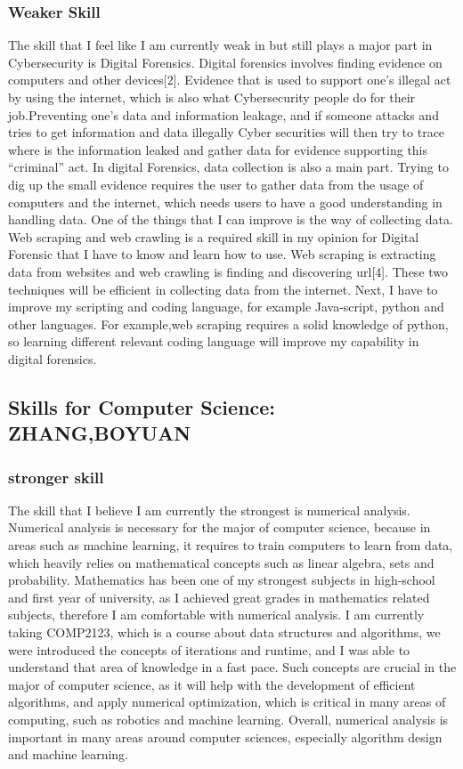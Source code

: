 \documentclass[a4paper, 11pt]{report}
\begin{document}
\subsubsection{Weaker Skill}
	The skill that I feel like I am currently weak in but still plays a major part in Cybersecurity is Digital Forensics. Digital forensics involves finding evidence on computers and other devices[2]. Evidence that is used to support one’s illegal act by using the internet, which is also what Cybersecurity people do for their job.Preventing one’s data and information leakage, and if someone attacks and tries to get information and data illegally Cyber securities will then try to trace where is the information leaked and gather data for evidence supporting this “criminal” act. In digital Forensics, data collection is also a main part. Trying to dig up the small evidence requires the user to gather data from the usage of computers and the internet, which needs users to have a good understanding in handling data. One of the things that I can improve is the way of collecting data. Web scraping and web crawling is a required skill in my opinion for Digital Forensic that I have to know and learn how to use. Web scraping is extracting data from websites and web crawling is finding and discovering url[4]. These two techniques will be efficient in collecting data from the internet. Next, I have to improve my scripting and coding language, for example Java-script, python and other languages. For example,web scraping requires a solid knowledge of python, so learning different relevant coding language will improve my capability in digital forensics.


\newpage
\subsection{Skills for Computer Science: ZHANG,BOYUAN}
\subsubsection{stronger skill}
	The skill that I believe I am currently the strongest is numerical analysis. 	Numerical analysis is necessary for the major of computer science, because in areas such as machine learning, it requires to train computers to learn from data, which heavily relies on mathematical concepts such as linear algebra, sets and probability. Mathematics has been one of my strongest subjects in high-school and first year of university, as I achieved great grades in mathematics related subjects, therefore I am comfortable with numerical analysis. I am currently taking COMP2123, which is a course about data structures and algorithms, we were introduced the concepts of iterations and runtime, and I was able to understand that area of knowledge in a fast pace. Such concepts are crucial in the major of  computer science, as it will help with the development of efficient algorithms, and apply numerical optimization, which is critical in many areas of computing, such as robotics and machine learning. Overall, numerical analysis is important in many areas around computer sciences, especially algorithm design and machine learning.
\end{document}
